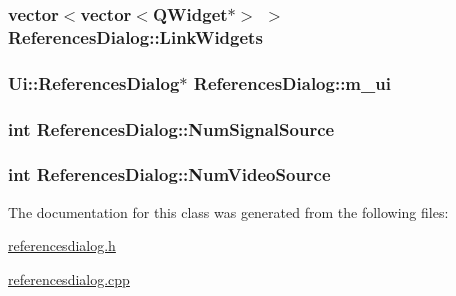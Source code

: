 \hypertarget{class_references_dialog_aa96dd6f334be4110a22c347af4a3f32}{
\subsubsection[{LinkWidgets}]{\setlength{\rightskip}{0pt plus 5cm}vector$<$vector$<$QWidget$\ast$$>$ $>$ {\bf ReferencesDialog::LinkWidgets}}}
\label{class_references_dialog_aa96dd6f334be4110a22c347af4a3f32}


\hypertarget{class_references_dialog_cc63187266913a0639e2dbe11782c772}{
\subsubsection[{m\_\-ui}]{\setlength{\rightskip}{0pt plus 5cm}Ui::ReferencesDialog$\ast$ {\bf ReferencesDialog::m\_\-ui}}}
\label{class_references_dialog_cc63187266913a0639e2dbe11782c772}


\hypertarget{class_references_dialog_cd8062e49e77e41d80d81a074a3a9934}{
\subsubsection[{NumSignalSource}]{\setlength{\rightskip}{0pt plus 5cm}int {\bf ReferencesDialog::NumSignalSource}}}
\label{class_references_dialog_cd8062e49e77e41d80d81a074a3a9934}


\hypertarget{class_references_dialog_4d3fd938d7e33ec8adc8659294906a81}{
\subsubsection[{NumVideoSource}]{\setlength{\rightskip}{0pt plus 5cm}int {\bf ReferencesDialog::NumVideoSource}}}
\label{class_references_dialog_4d3fd938d7e33ec8adc8659294906a81}




The documentation for this class was generated from the following files:\begin{CompactItemize}
\item 
\hyperlink{referencesdialog_8h}{referencesdialog.h}\item 
\hyperlink{referencesdialog_8cpp}{referencesdialog.cpp}\end{CompactItemize}
